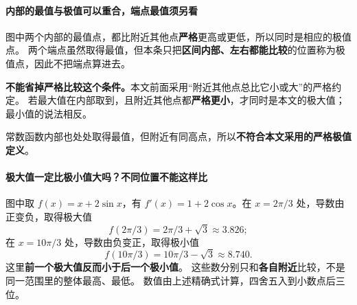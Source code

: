 \clearpage
\begin{explanationbox}
\paragraph{内部的最值与极值可以重合，端点最值须另看}
\begin{center}\end{center}

图中两个内部的最值点，都比附近其他点\textbf{严格}更高或更低，所以同时是相应的极值点。
两个端点虽然取得最值，但本条只把\textbf{区间内部、左右都能比较}的位置称为极值点，因此不把端点算进去。

\textbf{不能省掉严格比较这个条件。}本文前面采用“附近其他点总比它小或大”的严格约定。
若最大值在内部取到，且附近其他点都\textbf{严格更小}，才同时是本文的极大值；最小值的说法相反。
\begin{center}\end{center}
常数函数内部也处处取得最值，但附近有同高点，所以\textbf{不符合本文采用的严格极值定义}。
\end{explanationbox}
\clearpage
\begin{explanationbox}
\paragraph{极大值一定比极小值大吗？不同位置不能这样比}
\begin{center}\end{center}

图中取 $f(x)=x+2\sin x$，有 $f'(x)=1+2\cos x$。在 $x=2\pi/3$ 处，导数由正变负，取得极大值
\[
 f(2\pi/3)=2\pi/3+\sqrt3\approx3.826;
\]
在 $x=10\pi/3$ 处，导数由负变正，取得极小值
\[
 f(10\pi/3)=10\pi/3-\sqrt3\approx8.740.
\]
这里\textbf{前一个极大值反而小于后一个极小值}。
这些数分别只和\textbf{各自附近}比较，不是同一范围里的整体最高、最低。
数值由上述精确式计算，四舍五入到小数点后三位。
\end{explanationbox}


